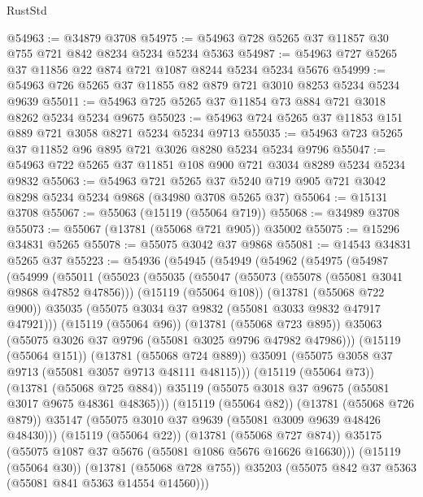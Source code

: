 \begin{lexlean}{RustStd}
\begin{coremodule}
@54963 := @34879 @3708
@54975 := @54963 @728 @5265 @37 @11857 @30 @755 @721 @842 @8234 @5234 @5234 @5363
@54987 := @54963 @727 @5265 @37 @11856 @22 @874 @721 @1087 @8244 @5234 @5234 @5676
@54999 := @54963 @726 @5265 @37 @11855 @82 @879 @721 @3010 @8253 @5234 @5234 @9639
@55011 := @54963 @725 @5265 @37 @11854 @73 @884 @721 @3018 @8262 @5234 @5234 @9675
@55023 := @54963 @724 @5265 @37 @11853 @151 @889 @721 @3058 @8271 @5234 @5234 @9713
@55035 := @54963 @723 @5265 @37 @11852 @96 @895 @721 @3026 @8280 @5234 @5234 @9796
@55047 := @54963 @722 @5265 @37 @11851 @108 @900 @721 @3034 @8289 @5234 @5234 @9832
@55063 := @54963
    @721
    @5265
    @37
    @5240
    @719
    @905
    @721
    @3042
    @8298
    @5234
    @5234
    @9868
    (@34980 @3708 @5265 @37)
@55064 := @15131 @3708
@55067 := @55063 (@15119 (@55064 @719))
@55068 := @34989 @3708
@55073 := @55067 (@13781 (@55068 @721 @905)) @35002
@55075 := @15296 @34831 @5265
@55078 := @55075 @3042 @37 @9868
@55081 := @14543 @34831 @5265 @37
@55223 := @54936
    (@54945
      (@54949
        (@54962
          (@54975
            (@54987
              (@54999
                (@55011
                  (@55023
                    (@55035
                      (@55047
                        (@55073 (@55078 (@55081 @3041 @9868 @47852 @47856)))
                        (@15119 (@55064 @108))
                        (@13781 (@55068 @722 @900))
                        @35035
                        (@55075 @3034 @37 @9832 (@55081 @3033 @9832 @47917 @47921)))
                      (@15119 (@55064 @96))
                      (@13781 (@55068 @723 @895))
                      @35063
                      (@55075 @3026 @37 @9796 (@55081 @3025 @9796 @47982 @47986)))
                    (@15119 (@55064 @151))
                    (@13781 (@55068 @724 @889))
                    @35091
                    (@55075 @3058 @37 @9713 (@55081 @3057 @9713 @48111 @48115)))
                  (@15119 (@55064 @73))
                  (@13781 (@55068 @725 @884))
                  @35119
                  (@55075 @3018 @37 @9675 (@55081 @3017 @9675 @48361 @48365)))
                (@15119 (@55064 @82))
                (@13781 (@55068 @726 @879))
                @35147
                (@55075 @3010 @37 @9639 (@55081 @3009 @9639 @48426 @48430)))
              (@15119 (@55064 @22))
              (@13781 (@55068 @727 @874))
              @35175
              (@55075 @1087 @37 @5676 (@55081 @1086 @5676 @16626 @16630)))
            (@15119 (@55064 @30))
            (@13781 (@55068 @728 @755))
            @35203
            (@55075 @842 @37 @5363 (@55081 @841 @5363 @14554 @14560)))

\end{coremodule}
\end{lexlean}
